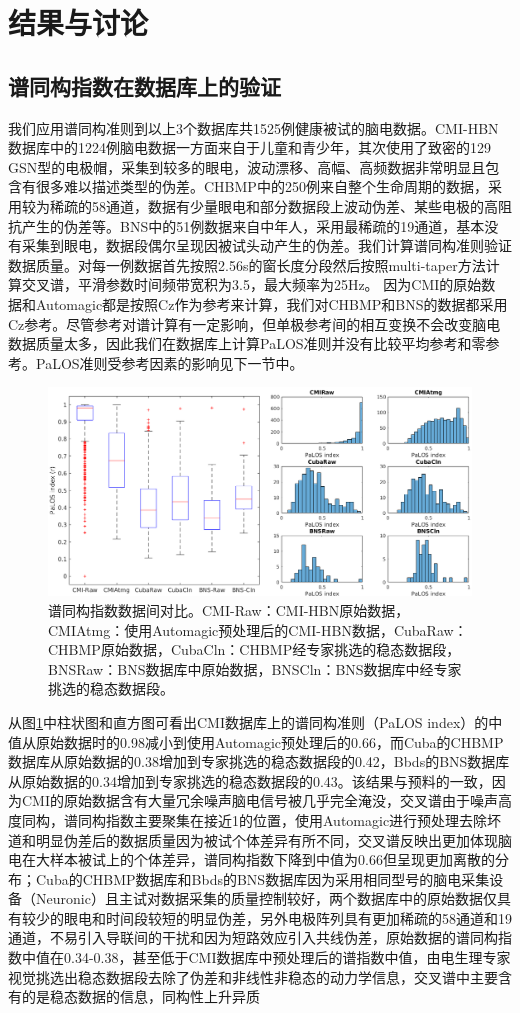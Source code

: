 \section{结果与讨论}
\subsection{谱同构指数在数据库上的验证}
我们应用谱同构准则到以上3个数据库共1525例健康被试的脑电数据。CMI-HBN数据库中的1224例脑电数据一方面来自于儿童和青少年，其次使用了致密的129 GSN型的电极帽，采集到较多的眼电，波动漂移、高幅、高频数据非常明显且包含有很多难以描述类型的伪差。CHBMP中的250例来自整个生命周期的数据，采用较为稀疏的58通道，数据有少量眼电和部分数据段上波动伪差、某些电极的高阻抗产生的伪差等。BNS中的51例数据来自中年人，采用最稀疏的19通道，基本没有采集到眼电，数据段偶尔呈现因被试头动产生的伪差。我们计算谱同构准则验证数据质量。对每一例数据首先按照2.56s的窗长度分段然后按照multi-taper方法计算交叉谱，平滑参数时间频带宽积为3.5，最大频率为25Hz。 因为CMI的原始数
据和Automagic都是按照Cz作为参考来计算，我们对CHBMP和BNS的数据都采用Cz参考。尽管参考对谱计算有一定影响，但单极参考间的相互变换不会改变脑电数据质量太多，因此我们在数据库上计算PaLOS准则并没有比较平均参考和零参考。PaLOS准则受参考因素的影响见下一节中。
\begin{figure}[!h]
	\includegraphics[width=15cm]{pic/palos/comparison.png}
	\caption{谱同构指数数据间对比。CMI-Raw：CMI-HBN原始数据，CMIAtmg：使用Automagic预处理后的CMI-HBN数据，CubaRaw：CHBMP原始数据，CubaCln：CHBMP经专家挑选的稳态数据段，BNSRaw：BNS数据库中原始数据，BNSCln：BNS数据库中经专家挑选的稳态数据段。}
	\label{paloscomp}
\end{figure}
从图\ref{paloscomp}中柱状图和直方图可看出CMI数据库上的谱同构准则（PaLOS index）的中值从原始数据时的0.98减小到使用Automagic预处理后的0.66，而Cuba的CHBMP数据库从原始数据的0.38增加到专家挑选的稳态数据段的0.42，Bbds的BNS数据库从原始数据的0.34增加到专家挑选的稳态数据段的0.43。该结果与预料的一致，因为CMI的原始数据含有大量冗余噪声脑电信号被几乎完全淹没，交叉谱由于噪声高度同构，谱同构指数主要聚集在接近1的位置，使用Automagic进行预处理去除坏道和明显伪差后的数据质量因为被试个体差异有所不同，交叉谱反映出更加体现脑电在大样本被试上的个体差异，谱同构指数下降到中值为0.66但呈现更加离散的分布；Cuba的CHBMP数据库和Bbds的BNS数据库因为采用相同型号的脑电采集设备（Neuronic）且主试对数据采集的质量控制较好，两个数据库中的原始数据仅具有较少的眼电和时间段较短的明显伪差，另外电极阵列具有更加稀疏的58通道和19通道，不易引入导联间的干扰和因为短路效应引入共线伪差，原始数据的谱同构指数中值在0.34-0.38，甚至低于CMI数据库中预处理后的谱指数中值，由电生理专家视觉挑选出稳态数据段去除了伪差和非线性非稳态的动力学信息，交叉谱中主要含有的是稳态数据的信息，同构性上升异质
